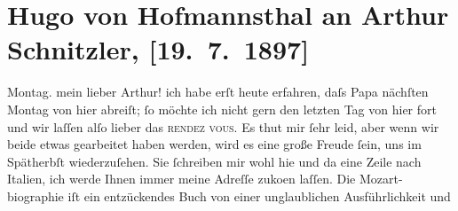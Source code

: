 

         
         \renewcommand{\erwaehntePersonen}{Personen: Richard Beer-Hofmann, Hugo von Hofmannsthal, Hugo August von Hofmannsthal, Wolfgang Amadeus Mozart}
         \renewcommand{\erwaehnteOrte}{Orte: Bad Fusch, Italien, Wien}
         \renewcommand{\erwaehnteWerke}{Werke: W. A. Mozart}
               \section[Hugo von Hofmannsthal an Arthur Schnitzler, {[}19. 7. 1897{]}]{ Hugo von Hofmannsthal an Arthur Schnitzler, {[}19. 7. 1897{]}}\nopagebreak{}\rehead{ }\begin{ledgroupsized}[t]{13cm}\normalsize\beginnumbering \toendnotes[C]{\smallbreak\pagebreak[2]} 
\toendnotes[C]{\smallbreak}\pstart
           \raggedleft{}{\pb}Montag.\pend
           \pstart{}mein lieber Arthur!\pend\pstart
           ich habe erſt heute erfahren, daſs Papa nächſten Montag von hier abreiſt; ſo möchte ich nicht gern den
               letzten Tag von hier fort und wir laſſen alſo lieber das \textsc{rendez
                  vous}. Es thut mir ſehr leid, aber wenn wir beide etwas gearbeitet haben
               werden, wird es eine große Freude ſein, uns im Spätherbſt wieder{\pb}zuſehen. Sie ſchreiben mir wohl
               hie und da eine Zeile nach Italien, ich werde
               Ihnen immer meine Adreſſe zuko{\geminationm}en laſſen.\pend
           \pstart
           Die Mozart-biographie iſt ein entzückendes Buch von einer unglaublichen Ausführlichkeit und

\end{ledgroupsized}
